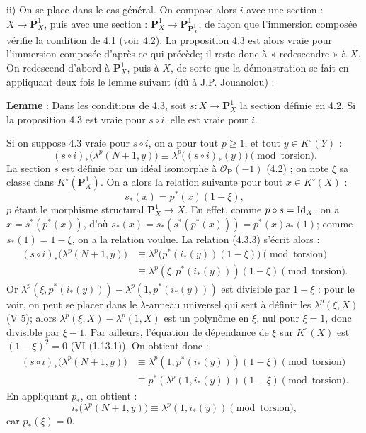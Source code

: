 ii) On se place dans le cas général. On compose alors \(i\) avec une section : \(X\to\mathbf P_X^1\), puis avec une section : \(\mathbf P_X^1\to\mathbf P_{\mathbf P_X^1}^1\), de façon que l'immersion composée vérifie la condition de 4.1 (voir 4.2). La proposition 4.3 est alors vraie pour l'immersion composée d'après ce qui précède; il reste donc à « redescendre » à \(X\). On redescend d'abord à \(\mathbf P_X^1\), puis à \(X\), de sorte que la démonstration se fait en appliquant deux fois le lemme suivant (dû à J.P. Jouanolou) :

\textbf{Lemme} : Dans les conditions de 4.3, soit \(s:X\to\mathbf P_X^1\) la section définie en 4.2. Si la proposition 4.3 est vraie pour \(s\circ i\), elle est vraie pour \(i\).

Si on suppose 4.3 vraie pour \(s\circ i\), on a pour tout \(p\ge1\), et tout \(y\in K^\circ(Y)\) :
\begin{equation}\tag{4.3.3}
 (s\circ i)_*\bigl(\lambda^p(N+1,y)\bigr)
 \equiv
 \lambda^p\bigl((s\circ i)_*(y)\bigr)
 \pmod{\text{torsion}}.
\end{equation}
La section \(s\) est définie par un idéal isomorphe à \(\mathcal O_{\mathbf P}(-1)\) (4.2) ; on note \(\xi\) sa classe dans \(K^\circ(\mathbf P_X^1)\). On a alors la relation suivante pour tout \(x\in K^\circ(X)\) :
\[
  s_*(x)=p^*(x)(1-\xi),
\]
\(p\) étant le morphisme structural \(\mathbf P_X^1\to X\). En effet, comme \(p\circ s=\operatorname{Id}_X\), on a \(x=s^*(p^*(x))\), d'où \(s_*(x)=s_*(s^*(p^*(x)))=p^*(x)s_*(1)\); comme \(s_*(1)=1-\xi\), on a la relation voulue. La relation (4.3.3) s'écrit alors :
\[
\begin{aligned}
(s\circ i)_*\bigl(\lambda^p(N+1,y)\bigr)
&\equiv \lambda^p\bigl(p^*(i_*(y))(1-\xi)\bigr)\pmod{\text{torsion}}\\
&\equiv \lambda^p(\xi,p^*(i_*(y)))(1-\xi)\pmod{\text{torsion}}.
\end{aligned}
\]
Or \(\lambda^p(\xi,p^*(i_*(y)))-\lambda^p(1,p^*(i_*(y)))\) est divisible par \(1-\xi\) :
pour le voir, on peut se placer dans le \(\lambda\)-anneau universel qui sert à définir les \(\lambda^p(\xi,X)\) (V 5); alors \(\lambda^p(\xi,X)-\lambda^p(1,X)\) est un polynôme en \(\xi\), nul pour \(\xi=1\), donc divisible par \(\xi-1\). Par ailleurs, l'équation de dépendance de \(\xi\) sur \(K^\circ(X)\) est \((1-\xi)^2=0\) (VI (1.13.1)). On obtient donc :
\[
\begin{aligned}
(s\circ i)_*\bigl(\lambda^p(N+1,y)\bigr)
&\equiv \lambda^p(1,p^*(i_*(y)))(1-\xi) \pmod{\text{torsion}}\\
&\equiv p^*(\lambda^p(1,i_*(y)))(1-\xi) \pmod{\text{torsion}}.
\end{aligned}
\]
En appliquant \(p_*\), on obtient :
\begin{equation}\tag{4.3.4}
  i_*\bigl(\lambda^p(N+1,y)\bigr)
  \equiv \lambda^p(1,i_*(y)) \pmod{\text{torsion}},
\end{equation}
car \(p_*(\xi)=0\).

